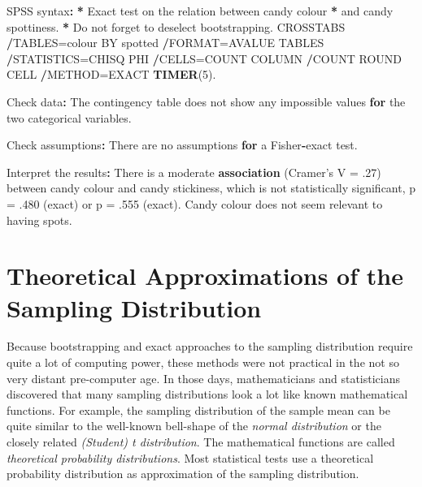 \documentclass[a4paper]{book}
\newenvironment{Shaded}{\begin{snugshade}}{\end{snugshade}}
\newcommand{\KeywordTok}[1]{\textcolor[rgb]{0,0,0}{\textbf{#1}}}
\newcommand{\DecValTok}[1]{\textcolor[rgb]{0.00,0.00,0.00}{#1}}
\newcommand{\StringTok}[1]{\textcolor[rgb]{0.00,0.00,0.00}{#1}}
\newcommand{\ControlFlowTok}[1]{\textcolor[rgb]{0.00,0.00,0.00}{\textbf{#1}}}
\newcommand{\OperatorTok}[1]{\textcolor[rgb]{0.00,0.00,0.00}{\textbf{#1}}}
\newcommand{\ErrorTok}[1]{\textcolor[rgb]{0.00,0.00,0.00}{\textbf{#1}}}
\newcommand{\NormalTok}[1]{#1}
\theoremstyle{definition}
\theoremstyle{definition}
\theoremstyle{definition}
\theoremstyle{remark}
\begin{document}
\begin{Shaded}
\begin{Highlighting}[]
\NormalTok{SPSS syntax}\OperatorTok{:}\StringTok{  }
\StringTok{  }
\ErrorTok{*}\StringTok{ }\NormalTok{Exact test on the relation between candy colour  }
\OperatorTok{*}\StringTok{ }\NormalTok{and candy spottiness.  }
\OperatorTok{*}\StringTok{ }\NormalTok{Do not forget to deselect bootstrapping.  }
\NormalTok{CROSSTABS  }
  \OperatorTok{/}\NormalTok{TABLES=colour BY spotted  }
  \OperatorTok{/}\NormalTok{FORMAT=AVALUE TABLES  }
  \OperatorTok{/}\NormalTok{STATISTICS=CHISQ PHI   }
  \OperatorTok{/}\NormalTok{CELLS=COUNT COLUMN   }
  \OperatorTok{/}\NormalTok{COUNT ROUND CELL  }
  \OperatorTok{/}\NormalTok{METHOD=EXACT }\KeywordTok{TIMER}\NormalTok{(}\DecValTok{5}\NormalTok{).  }
  
\NormalTok{Check data}\OperatorTok{:}\StringTok{  }
\StringTok{  }
\NormalTok{The contingency table does not show any impossible values }\ControlFlowTok{for}  
\NormalTok{the two categorical variables.  }
  
\NormalTok{Check assumptions}\OperatorTok{:}\StringTok{  }
\StringTok{  }
\NormalTok{There are no assumptions }\ControlFlowTok{for}\NormalTok{ a Fisher}\OperatorTok{-}\NormalTok{exact test.  }
  
\NormalTok{Interpret the results}\OperatorTok{:}\StringTok{  }
\StringTok{  }
\NormalTok{There is a moderate }\KeywordTok{association}\NormalTok{ (Cramer}\StringTok{'s V = .27) between   }
\StringTok{candy colour and candy stickiness, which is   }
\StringTok{not statistically significant, p = .480 (exact) or}
\StringTok{p = .555 (exact).   }
\StringTok{Candy colour does not seem relevant to having spots.  }
\end{Highlighting}
\end{Shaded}

\section{Theoretical Approximations of the Sampling
Distribution}\label{theoretical-approximations-of-the-sampling-distribution}

Because bootstrapping and exact approaches to the sampling distribution
require quite a lot of computing power, these methods were not practical
in the not so very distant pre-computer age. In those days,
mathematicians and statisticians discovered that many sampling
distributions look a lot like known mathematical functions. For example,
the sampling distribution of the sample mean can be quite similar to the
well-known bell-shape of the \emph{normal distribution} or the closely
related \emph{(Student) t distribution}. The mathematical functions are
called \emph{theoretical probability distributions}. Most statistical
tests use a theoretical probability distribution as approximation of the
sampling distribution.
\end{document}
